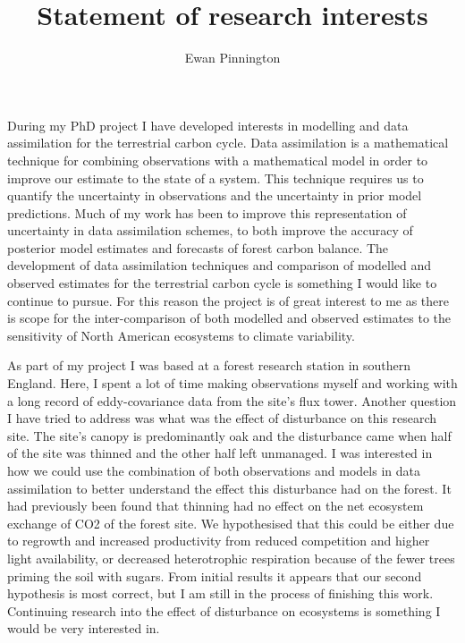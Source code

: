 \documentclass[11pt]{article}
\title{Statement of research interests}
\author{Ewan Pinnington}
\date{}
\begin{document}
\maketitle

During my PhD project I have developed interests in modelling and data assimilation for the terrestrial carbon cycle. Data assimilation is a mathematical technique for combining observations with a mathematical model in order to improve our estimate to the state of a system. This technique requires us to quantify the uncertainty in observations and the uncertainty in prior model predictions. Much of my work has been to improve this representation of uncertainty in data assimilation schemes, to both improve the accuracy of posterior model estimates and forecasts of forest carbon balance. The development of data assimilation techniques and comparison of modelled and observed estimates for the terrestrial carbon cycle is something I would like to continue to pursue. For this reason the project is of great interest to me as there is scope for the inter-comparison of both modelled and observed estimates to the sensitivity of North American ecosystems to climate variability.

As part of my project I was based at a forest research station in southern England. Here, I spent a lot of time making observations myself and working with a long record of eddy-covariance data from the site's flux tower. Another question I have tried to address was what was the effect of disturbance on this research site. The site's canopy is predominantly oak and the disturbance came when half of the site was thinned and the other half left unmanaged. I was interested in how we could use the combination of both observations and models in data assimilation to better understand the effect this disturbance had on the forest. It had previously been found that thinning had no effect on the net ecosystem exchange of CO2 of the forest site. We hypothesised that this could be either due to regrowth and increased productivity from reduced competition and higher light availability, or decreased heterotrophic respiration because of the fewer trees priming the soil with sugars. From initial results it appears that our second hypothesis is most correct, but I am still in the process of finishing this work. Continuing research into the effect of disturbance on ecosystems is something I would be very interested in.   
\end{document}
